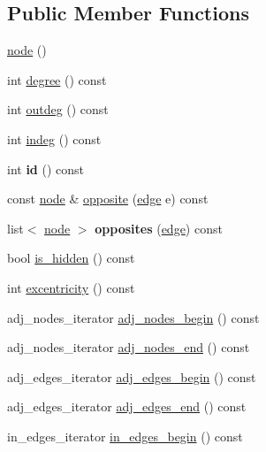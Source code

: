 \subsection*{Public Member Functions}
\begin{DoxyCompactItemize}
\item 
\mbox{\hyperlink{classnode_ad603259398d5667e3b97a6322a2bcc20}{node}} ()
\item 
int \mbox{\hyperlink{classnode_a1e5e94e426da180a069cf307616e38e3}{degree}} () const
\item 
int \mbox{\hyperlink{classnode_a32adc45c4132e2642ccd2233d79ffe67}{outdeg}} () const
\item 
int \mbox{\hyperlink{classnode_a749bfd1316584b96f8c9b0e44ad512f0}{indeg}} () const
\item 
\mbox{\label{classnode_a5d38b4152c3cedb235e45de7eb3f4469}} 
int {\bfseries id} () const
\item 
const \mbox{\hyperlink{classnode}{node}} \& \mbox{\hyperlink{classnode_a13dbd1809a33a5efede64a359e53a363}{opposite}} (\mbox{\hyperlink{classedge}{edge}} e) const
\item 
\mbox{\label{classnode_aa27614c7a557ea4b5b1d621c887e3ca5}} 
list$<$ \mbox{\hyperlink{classnode}{node}} $>$ {\bfseries opposites} (\mbox{\hyperlink{classedge}{edge}}) const
\item 
bool \mbox{\hyperlink{classnode_af948e15fd00a31e67928c9061acda582}{is\+\_\+hidden}} () const
\item 
int \mbox{\hyperlink{classnode_aba6b3a48e7b951f08ebbbf3275f0ce9a}{excentricity}} () const
\item 
adj\+\_\+nodes\+\_\+iterator \mbox{\hyperlink{classnode_a6cd2febf910bc6572c4aecba6278b100}{adj\+\_\+nodes\+\_\+begin}} () const
\item 
adj\+\_\+nodes\+\_\+iterator \mbox{\hyperlink{classnode_a2477fa92c56a19d29464082444a3043a}{adj\+\_\+nodes\+\_\+end}} () const
\item 
adj\+\_\+edges\+\_\+iterator \mbox{\hyperlink{classnode_a788d3e932a5c164caa5ec82aa47551b2}{adj\+\_\+edges\+\_\+begin}} () const
\item 
adj\+\_\+edges\+\_\+iterator \mbox{\hyperlink{classnode_aa1e7887d29390297580769454f769ad6}{adj\+\_\+edges\+\_\+end}} () const
\item 
in\+\_\+edges\+\_\+iterator \mbox{\hyperlink{classnode_a0c32377f370ae52ed2134ff8d4dac584}{in\+\_\+edges\+\_\+begin}} () const
\item 

\end{DoxyCompactItemize}
